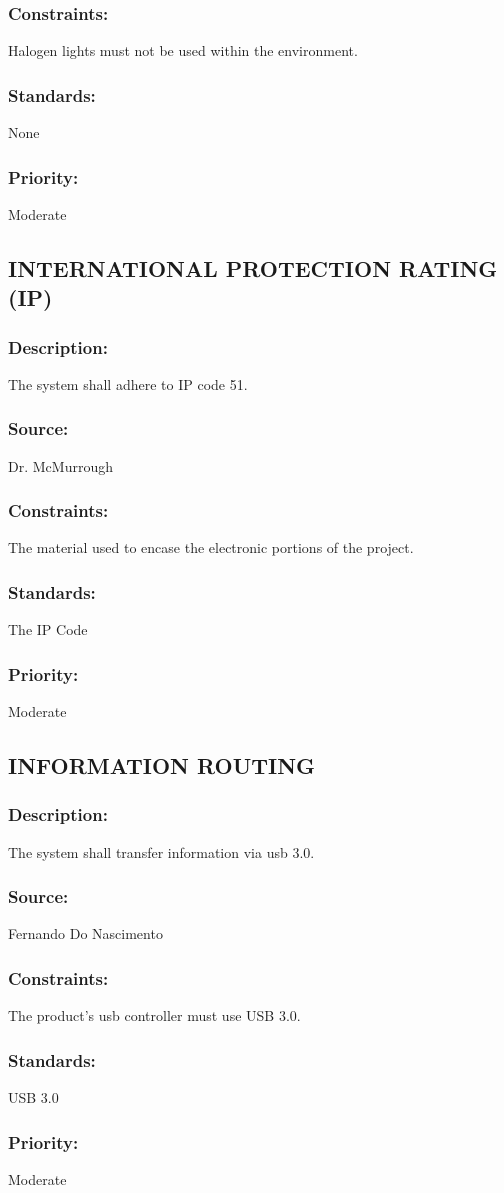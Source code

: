 \subsubsection{Constraints:} 
	{Halogen lights must not be used within the environment.}
\subsubsection{Standards:} 
	{None}
\subsubsection{Priority:} 
	{Moderate}
\newline
	
\subsection{\text INTERNATIONAL PROTECTION RATING (IP)}
\subsubsection{Description:} 
	{The system shall adhere to IP code 51.}
\subsubsection{Source:} 
	{Dr. McMurrough}
\subsubsection{Constraints:} 
	{The material used to encase the electronic portions of the project.}
\subsubsection{Standards:} 
	{The IP Code}
\subsubsection{Priority:} 
	{Moderate}
\newline
	
\subsection{\text INFORMATION ROUTING }
\subsubsection{Description:} 
	{The system shall transfer information via usb 3.0.}
\subsubsection{Source:} 
	{Fernando Do Nascimento}
\subsubsection{Constraints:} 
	{The product's usb controller must use USB 3.0.}
\subsubsection{Standards:} 
	{USB 3.0}
\subsubsection{Priority:} 
	{Moderate}

